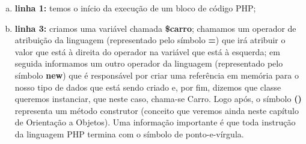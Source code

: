 \begin{enumerate}[a)]
    \item \textbf{linha 1:} temos o início da execução de um bloco de código PHP;
    \item \textbf{linha 3:} criamos uma variável chamada \textbf{\$carro};
    chamamos um operador de atribuição da linguagem (representado pelo símbolo
    \textbf{=}) que irá atribuir o valor que está à direita do operador na
    variável que está à esquerda; em seguida informamos um outro operador da 
    linguagem (representado pelo símbolo \textbf{new}) que é responsável por
    criar uma referência em memória para o nosso tipo de dados que está sendo 
    criado e, por fim, dizemos que classe queremos instanciar, que neste caso, 
    chama-se Carro. Logo após, o símbolo \textbf{()} representa um método
    construtor (conceito que veremos ainda neste capítulo de Orientação a Objetos). 
    Uma informação importante é que toda instrução da linguagem PHP termina 
    com o símbolo de ponto-e-vírgula.
\end{enumerate}